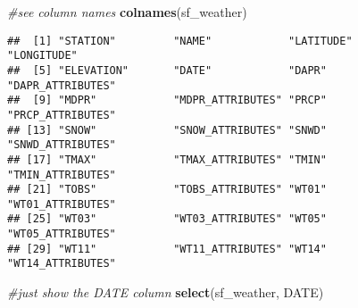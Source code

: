\documentclass[
]{article}
\newenvironment{Shaded}{\begin{snugshade}}{\end{snugshade}}
\newcommand{\CommentTok}[1]{\textcolor[rgb]{0.56,0.35,0.01}{\textit{#1}}}
\newcommand{\FunctionTok}[1]{\textcolor[rgb]{0.13,0.29,0.53}{\textbf{#1}}}
\newcommand{\NormalTok}[1]{#1}
\begin{document}
\begin{Shaded}
\begin{Highlighting}[]
\CommentTok{\#see column names}
\FunctionTok{colnames}\NormalTok{(sf\_weather)}
\end{Highlighting}
\end{Shaded}

\begin{verbatim}
##  [1] "STATION"         "NAME"            "LATITUDE"        "LONGITUDE"      
##  [5] "ELEVATION"       "DATE"            "DAPR"            "DAPR_ATTRIBUTES"
##  [9] "MDPR"            "MDPR_ATTRIBUTES" "PRCP"            "PRCP_ATTRIBUTES"
## [13] "SNOW"            "SNOW_ATTRIBUTES" "SNWD"            "SNWD_ATTRIBUTES"
## [17] "TMAX"            "TMAX_ATTRIBUTES" "TMIN"            "TMIN_ATTRIBUTES"
## [21] "TOBS"            "TOBS_ATTRIBUTES" "WT01"            "WT01_ATTRIBUTES"
## [25] "WT03"            "WT03_ATTRIBUTES" "WT05"            "WT05_ATTRIBUTES"
## [29] "WT11"            "WT11_ATTRIBUTES" "WT14"            "WT14_ATTRIBUTES"
\end{verbatim}

\begin{Shaded}
\begin{Highlighting}[]
\CommentTok{\#just show the DATE column}
\FunctionTok{select}\NormalTok{(sf\_weather, DATE)}
\end{Highlighting}
\end{Shaded}
\end{document}
